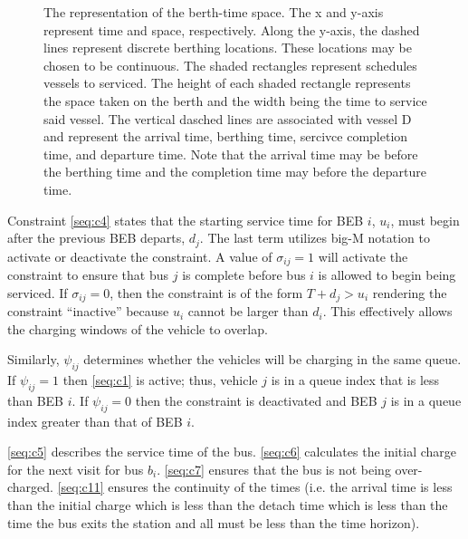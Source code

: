 \documentclass[11pt,a4paper,final]{article}
\begin{document}
\begin{figure}[ht!]
{{
  }}
  \caption{The representation of the berth-time space. The x and y-axis represent time and space, respectively. Along the y-axis, the dashed lines represent discrete berthing locations. These locations may be chosen to be continuous. The shaded rectangles represent schedules vessels to serviced. The height of each shaded rectangle represents the space taken on the berth and the width being the time to service said vessel. The vertical dasched lines are associated with vessel D and represent the arrival time, berthing time, sercivce completion time, and departure time. Note that the arrival time may be before the berthing time and the completion time may before the departure time.}
  \label{fig:spacial-and-temporal-constr}
\end{figure}

Constraint \ref{seq:c4} states that the starting service time for BEB \(i\), \(u_i\), must begin after the previous BEB
departs, \(d_j\). The last term utilizes big-M notation to activate or deactivate the constraint. A value of \(\sigma_{ij} = 1\)
will activate the constraint to ensure that bus \(j\) is complete before bus \(i\) is allowed to begin being serviced. If
\(\sigma_{ij} = 0\), then the constraint is of the form \(T + d_j > u_i\) rendering the constraint ``inactive'' because \(u_i\)
cannot be larger than \(d_i\). This effectively allows the charging windows of the vehicle to overlap.

Similarly, \(\psi_{ij}\) determines whether the vehicles will be charging in the same queue. If \(\psi_{ij} = 1\) then
\eqref{seq:c1} is active; thus, vehicle \(j\) is in a queue index that is less than BEB \(i\). If \(\psi_{ij} = 0\) then the
constraint is deactivated and BEB \(j\) is in a queue index greater than that of BEB \(i\).

\ref{seq:c5} describes the service time of the bus. \ref{seq:c6} calculates the initial charge for the next visit for
bus \(b_i\). \ref{seq:c7} ensures that the bus is not being over-charged. \ref{seq:c11} ensures the continuity of the
times (i.e. the arrival time is less than the initial charge which is less than the detach time which is less than the
time the bus exits the station and all must be less than the time horizon).
\end{document}
